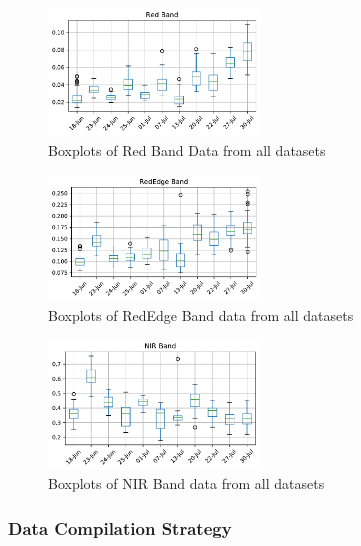 \documentclass[sigconf, nonacm, natbib, screen, balance=False]{acmart}
\begin{document}
\begin{figure}[!h]
   \hspace*{-0.25in}
   \includegraphics[width=0.5\textwidth, angle=0,]{Red.pdf}
  \caption{Boxplots of Red Band Data from all datasets}
  \label{fig:red}
\end{figure}

\begin{figure}[!h]
   \hspace*{-0.25in}
   \includegraphics[width=0.5\textwidth, angle=0,]{RedEdge.pdf}
  \caption{Boxplots of RedEdge Band data from all datasets}
  \label{fig:rededge}
\end{figure}

\begin{figure}[!h]
   \hspace*{-0.25in}
   \includegraphics[width=0.5\textwidth, angle=0,]{NIR.pdf}
  \caption{Boxplots of NIR Band data from all datasets}
  \label{fig:nir}
\end{figure}

\subsubsection{Data Compilation Strategy}\label{sec:strategy}
\end{document}
